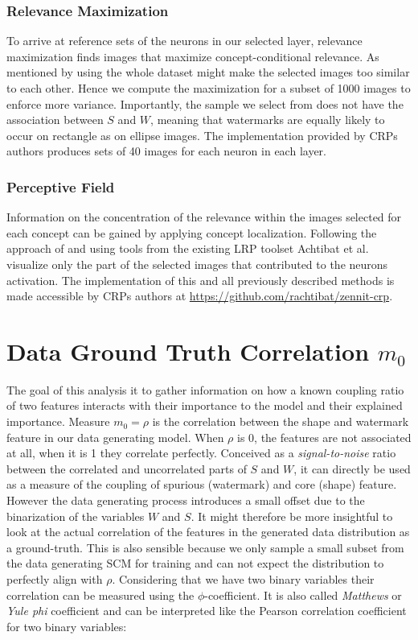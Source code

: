 {\color{gray} \subsubsection{Relevance Maximization}
To arrive at reference sets of the neurons in our selected layer, relevance maximization finds images that maximize concept-conditional relevance. As mentioned by \cite{Achtibat2022} using the whole dataset might make the selected images too similar to each other. Hence we compute the maximization for a subset of 1000 images to enforce more variance. Importantly, the sample we select from does not have the association between $S$ and $W$, meaning that watermarks are equally likely to occur on rectangle as on ellipse images. 
The implementation provided by CRPs authors produces sets of 40 images for each neuron in each layer. 

\subsubsection{Perceptive Field}
Information on the concentration of the relevance within the images selected for each concept can be gained by applying concept localization. Following the approach of \cite{Yeh2020} and using tools from the existing LRP toolset \cite{Anders2023} Achtibat et al. visualize only the part of the selected images that contributed to the neurons activation. 
The implementation of this and all previously described methods is made accessible by CRPs authors at \url{https://github.com/rachtibat/zennit-crp}.
}


\section{Data Ground Truth Correlation $m_0$}
The goal of this analysis it to gather information on how a known coupling ratio of two features interacts with their importance to the model and their explained importance. 
Measure $m_0 = \rho$ is the correlation between the shape and watermark feature in our data generating model. When $\rho$ is 0, the features are not associated at all, when it is 1 they correlate perfectly. Conceived as a \textit{signal-to-noise} ratio between the correlated and uncorrelated parts of $S$ and $W$, it can directly be used as a measure of the coupling of spurious (watermark) and core (shape) feature. However the data generating process introduces a small offset due to the binarization of the variables $W$ and $S$. It might therefore be more insightful to look at the actual correlation of the features in the generated data distribution as a ground-truth. This is also sensible because we only sample a small subset from the data generating SCM  for training and can not expect the distribution to perfectly align with $\rho$. Considering that we have two binary variables their correlation can be measured using the $\phi$-coefficient. It is also called \textit{Matthews} or \textit{Yule phi} coefficient and can be interpreted like the Pearson correlation coefficient for two binary variables:

